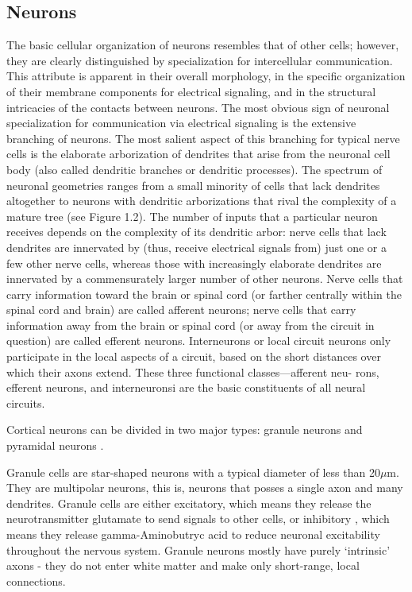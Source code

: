 \subsection{Neurons}

The basic cellular organization of neurons resembles that of other cells; however, they are clearly distinguished by specialization for intercellular communication.
This attribute is apparent in their overall morphology, in the specific organization of their membrane components for electrical signaling, and in the structural intricacies of the contacts between neurons.
The most obvious sign of neuronal specialization for communication via electrical signaling is the extensive branching of neurons.
The most salient aspect of this branching for typical nerve cells is the elaborate arborization of dendrites that arise from the neuronal cell body (also called dendritic branches or dendritic processes).
The spectrum of neuronal geometries ranges from a small minority of cells that lack dendrites altogether to neurons with dendritic arborizations that rival the complexity of a mature tree (see Figure 1.2).
The number of inputs that a particular neuron receives depends on the complexity of its dendritic arbor: nerve cells that lack dendrites are innervated by (thus, receive electrical signals from) just one or a few other nerve cells, whereas those with increasingly elaborate dendrites are innervated by a commensurately larger number of other neurons.
Nerve cells that carry information toward the brain or spinal cord (or farther centrally within the spinal cord and brain) are called afferent neurons; nerve cells that carry information away from the brain or spinal cord (or away from the circuit in question) are called efferent neurons. Interneurons or local circuit neurons only participate in the local aspects of a circuit, based on the short distances over which their axons extend. These three functional classes—afferent neu- rons, efferent neurons, and interneuronsi are the basic constituents of all neural circuits.

Cortical neurons can be divided in two major types: granule neurons and pyramidal neurons \cite{Johns}.

Granule cells are star-shaped neurons with a typical diameter of less than 20$\mu$m.
They are multipolar neurons, this is, neurons that posses a single axon and many dendrites.
Granule cells are either excitatory, which means they release the neurotransmitter glutamate to send signals to other cells, or inhibitory \cite{Bekkers2011}, which means they release gamma-Aminobutryc acid to reduce neuronal excitability throughout the nervous system.
Granule neurons mostly have purely ‘intrinsic’ axons - they do not enter white matter and make only short-range, local connections.


